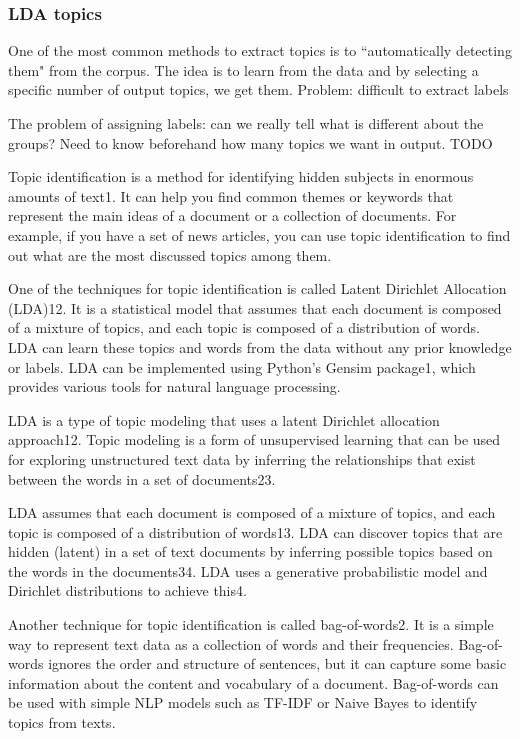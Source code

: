 \subsubsection{LDA topics}

One of the most common methods to extract topics is to ``automatically detecting them" from the corpus.
The idea is to learn from the data and by selecting a specific number of output topics, we get them.
Problem: difficult to extract labels

The problem of assigning labels: can we really tell what is different about the groups?
Need to know beforehand how many topics we want in output.
TODO

Topic identification is a method for identifying hidden subjects in enormous amounts of text1. It can help you find common themes or keywords that represent the main ideas of a document or a collection of documents. For example, if you have a set of news articles, you can use topic identification to find out what are the most discussed topics among them.

One of the techniques for topic identification is called Latent Dirichlet Allocation (LDA)12. It is a statistical model that assumes that each document is composed of a mixture of topics, and each topic is composed of a distribution of words. LDA can learn these topics and words from the data without any prior knowledge or labels. LDA can be implemented using Python’s Gensim package1, which provides various tools for natural language processing.

LDA is a type of topic modeling that uses a latent Dirichlet allocation approach12. Topic modeling is a form of unsupervised learning that can be used for exploring unstructured text data by inferring the relationships that exist between the words in a set of documents23.

LDA assumes that each document is composed of a mixture of topics, and each topic is composed of a distribution of words13. LDA can discover topics that are hidden (latent) in a set of text documents by inferring possible topics based on the words in the documents34. LDA uses a generative probabilistic model and Dirichlet distributions to achieve this4.

Another technique for topic identification is called bag-of-words2. It is a simple way to represent text data as a collection of words and their frequencies. Bag-of-words ignores the order and structure of sentences, but it can capture some basic information about the content and vocabulary of a document. Bag-of-words can be used with simple NLP models such as TF-IDF or Naive Bayes to identify topics from texts.


